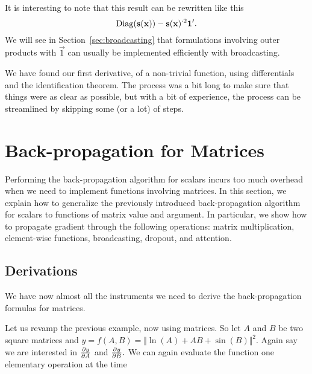 \documentclass[pdflatex,sn-mathphys-num]{sn-jnl}%
\theoremstyle{thmstyleone}%
\theoremstyle{thmstyletwo}%
\theoremstyle{thmstylethree}%
\begin{document}
It is interesting to note that this result can be rewritten like this
\[\mathrm{Diag}(\mathbf{s}(\mathbf{x})) - \mathbf{s}(\mathbf{x})^{{\cdot}2} \mathbf{1}'.\] 
We will see in
Section~\ref{sec:broadcasting} that formulations involving outer products with
\(\vec 1\) can usually be implemented efficiently with broadcasting.

We have found our first derivative, of a non-trivial function, using
differentials and the identification theorem. The process was a bit long to make
sure that things were as clear as possible, but with a bit of experience, the
process can be streamlined by skipping some (or a lot) of steps.
\fi

\section{Back-propagation for Matrices}\label{sec:contribution}

Performing the back-propagation algorithm for scalars incurs too much overhead
when we need to implement functions involving matrices. In this section, we
explain how to generalize the previously introduced back-propagation algorithm
for scalars to functions of matrix value and argument. In particular, we show
how to propagate gradient through the following operations: matrix
multiplication, element-wise functions, broadcasting, dropout, and attention.

\subsection{Derivations}\label{sec:derivations}

We have now almost all the instruments we need to derive the back-propagation
formulas for matrices.

Let us revamp the previous example, now using matrices. So let \(A\) and
\(B\) be two square matrices and \(y = f(A,B) = \Vert\!\ln(A) + A B +
\sin(B)\Vert^2.\) Again say we are interested in \(\textstyle\frac{\partial y}{\partial A}\) and
\(\textstyle\frac{\partial y}{\partial B}.\) We can again evaluate the function one elementary
operation at the time
\end{document}
